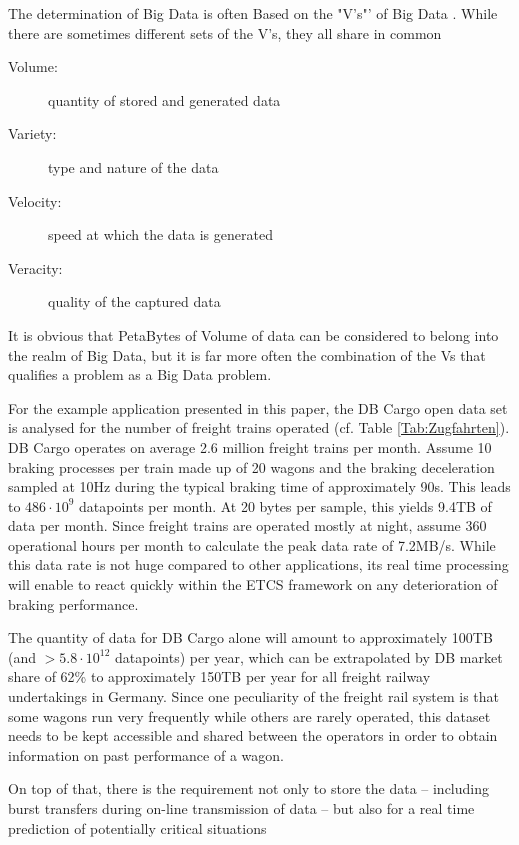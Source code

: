 \documentclass[a4paper, 12pt]{scrartcl}
\begin{document}
The determination of Big Data is often Based on the "V's"' of Big Data \cite{hilbert2016big, Eadline2016}. While there are sometimes different sets of the V's, they all share in common
\begin{description}
	\item[Volume:] quantity of stored and generated data 
	\item[Variety:] type and nature of the data
	\item[Velocity:] speed at which the data is generated
	\item[Veracity:] quality of the captured data
\end{description}
It is obvious that PetaBytes of Volume of data can be considered to belong into the realm of Big Data, but it is far more often the combination of the Vs that qualifies a problem as a Big Data problem.

For the example application presented in this paper, the DB Cargo open data set \cite{DBOpenDataZug} is analysed for the number of freight trains operated (cf. Table \ref{Tab:Zugfahrten}). DB Cargo operates on average 2.6 million freight trains per month. Assume 10 braking processes per train made up of 20 wagons and the braking deceleration sampled at 10Hz during the typical braking time of approximately 90s. This leads to $486\cdot 10^9$ datapoints per month. At 20 bytes per sample, this yields 9.4TB of data per month. Since freight trains are operated mostly at night, assume 360 operational hours per month to calculate the peak data rate of 7.2MB/s. While this data rate is not huge compared to other applications, its real time processing will enable to react quickly within the ETCS framework on any deterioration of braking performance.

The quantity of data for DB Cargo alone will amount to approximately 100TB (and $>5.8\cdot 10^{12}$ datapoints) per year, which can be extrapolated by DB market share of 62\% to approximately 150TB per year for all freight railway undertakings in Germany. Since one peculiarity of the freight rail system is that some wagons run very frequently while others are rarely operated, this dataset needs to be kept accessible and shared between the operators in order to obtain  information on past performance of a wagon.

On top of that, there is the requirement not only to store the data -- including burst transfers during on-line transmission of data -- but also for a real time prediction of potentially critical situations
\end{document}
